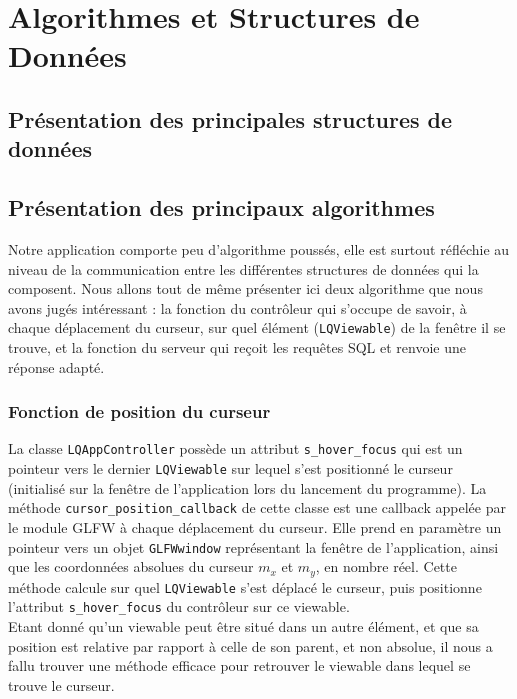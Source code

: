 \documentclass{report}
\begin{document}
\chapter{Algorithmes et Structures de Données}
\section{Présentation des principales structures de données}
\section{Présentation des principaux algorithmes}
Notre application comporte peu d'algorithme poussés, elle est surtout réfléchie au niveau de la communication entre les différentes structures de données qui la composent. Nous allons tout de même présenter ici deux algorithme que nous avons jugés intéressant : la fonction du contrôleur qui s'occupe de savoir, à chaque déplacement du curseur, sur quel élément (\verb!LQViewable!) de la fenêtre il se trouve, et la fonction du serveur qui reçoit les requêtes SQL et renvoie une réponse adapté.
\subsection{Fonction de position du curseur}
La classe \verb!LQAppController! possède un attribut \verb!s_hover_focus! qui est un pointeur vers le dernier \verb!LQViewable! sur lequel s'est positionné le curseur (initialisé sur la fenêtre de l'application lors du lancement du programme).
La méthode \verb!cursor_position_callback! de cette classe est une callback appelée par le module GLFW à chaque déplacement du curseur. Elle prend en paramètre un pointeur vers un objet \verb!GLFWwindow! représentant la fenêtre de l'application, ainsi que les coordonnées absolues du curseur $m_x$ et $m_y$, en nombre réel. Cette méthode calcule sur quel \verb!LQViewable! s'est déplacé le curseur, puis positionne l'attribut \verb!s_hover_focus! du contrôleur sur ce viewable. \\
Etant donné qu'un viewable peut être situé dans un autre élément, et que sa position est relative par rapport à celle de son parent, et non absolue, il nous a fallu trouver une méthode efficace pour retrouver le viewable dans lequel se trouve le curseur. \\
\end{document}

